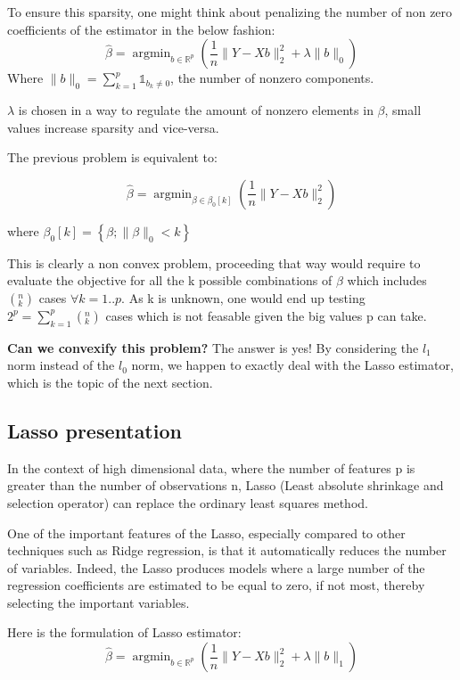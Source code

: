 \documentclass[10pt,onecolumn,letterpaper]{article}
\DeclareMathOperator*{\argmin}{argmin}
\begin{document}
To ensure this sparsity, one might think about penalizing the number of non zero coefficients of the estimator in the below fashion:
$$
\hat{\beta} = \argmin_{b \in \mathbb{R}^p} \left( \frac{1}{n}\lVert Y - Xb \rVert_2^2 + \lambda \lVert b \rVert_0 \right )
$$
Where $\lVert b \rVert_0 = \sum_{k=1}^p \mathds{1}_{b_k \neq 0}$, the number of  nonzero components. 

$\lambda$ is chosen in a way to regulate the amount of nonzero elements in $\beta$, small values increase sparsity and vice-versa.

The previous problem is equivalent to:

$$
\hat{\beta} = \argmin_{\beta \in \beta_0[k]} \left( \frac{1}{n}\lVert Y - Xb \rVert_2^2 \right )
$$

where $\beta_0[k] = \left\{\beta;  \lVert \beta \rVert_0 < k\right\}$ 
\newline


This is clearly a non convex problem, proceeding that way would require to evaluate the objective for all the k possible combinations of $\beta$ which includes $\left( ^n_k\right) $ cases $\forall k = 1..p$. As k is unknown, one would end up testing $2^p = \sum_{k=1}^p \left( ^n_k\right)$ cases which is not feasable given the big values p can take.
\newline


\textbf{Can we convexify this problem?}
The answer is yes! By considering the $l_1$ norm instead of the $l_0$ norm, we happen to exactly deal with the Lasso estimator, which is the topic of the next section.

\subsection{Lasso presentation }

In the context of high dimensional data, where the number of features p is greater than the number of observations n, Lasso (Least absolute shrinkage and selection operator) can replace the ordinary least squares method.

One of the important features of the Lasso, especially compared to other techniques such as Ridge regression, is that it automatically reduces the number of variables. Indeed, the Lasso produces models where a large number of the regression coefficients are estimated to be equal to zero, if not most, thereby selecting the important variables.
\newline


Here is the formulation of Lasso estimator:
$$
\hat{\beta} = \argmin_{b \in \mathbb{R}^p} \left( \frac{1}{n}\lVert Y - Xb \rVert_2^2 + \lambda \lVert b \rVert_1 \right )
$$
\end{document}
